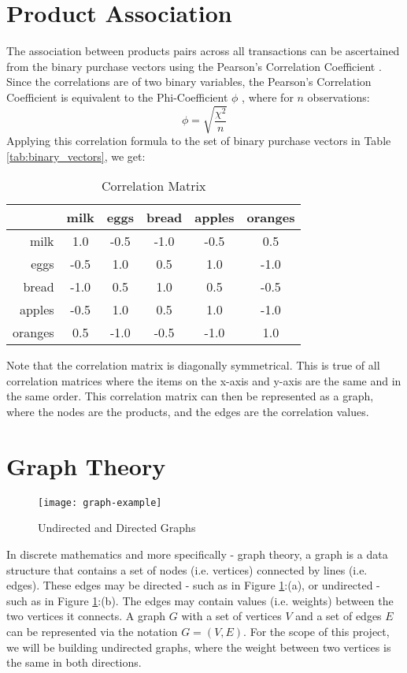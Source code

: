 \section{Product Association}
The association between products pairs across all transactions can be ascertained from the binary purchase vectors using the Pearson's Correlation Coefficient . Since the correlations are of two binary variables, the Pearson's Correlation Coefficient is equivalent to the Phi-Coefficient $\phi$ , where for $n$ observations:
\[
\phi = \sqrt{\frac{\chi^2}{n}}
\]
Applying this correlation formula to the set of binary purchase vectors in Table \ref{tab:binary_vectors}, we get:
\begin{table}[H]
\centering
\begin{tabular}{@{}r|ccccc@{}}
\toprule
 & milk & eggs & bread & apples & oranges \\ \midrule
milk &   1.0    & -0.5    & -1.0     & -0.5      & 0.5       \\ \bottomrule
eggs &   -0.5    & 1.0    & 0.5     & 1.0      & -1.0       \\ \bottomrule
bread &  -1.0    & 0.5    & 1.0     & 0.5      & -0.5       \\ \bottomrule
apples & -0.5    & 1.0    & 0.5     & 1.0     & -1.0      \\ \bottomrule
oranges& 0.5    & -1.0    & -0.5     & -1.0      & 1.0      \\ \bottomrule
\end{tabular}
\caption{Correlation Matrix}
\label{tab:correlation}
\end{table}
\noindent Note that the correlation matrix is diagonally symmetrical. This is true of all correlation matrices where the items on the x-axis and y-axis are the same and in the same order. This correlation matrix can then be represented as a graph, where the nodes are the products, and the edges are the correlation values.

\section{Graph Theory}
\begin{figure}[H]
\centering
\texttt{[image: graph-example]}
\caption{Undirected and Directed Graphs}
\label{fig:graph.example}
\end{figure}
In discrete mathematics and more specifically - graph theory, a graph is a data structure that contains a set of nodes (i.e. vertices) connected by lines (i.e. edges).  These edges may be directed - such as in Figure \ref{fig:graph.example}:(a), or undirected - such as in Figure \ref{fig:graph.example}:(b). The edges may contain values (i.e. weights) between the two vertices it connects. A graph $G$ with a set of vertices $V$ and a set of edges $E$ can be represented via the notation $G = (V,E)$. For the scope of this project,  we will be building undirected graphs, where the weight between two vertices is the same in both directions.

